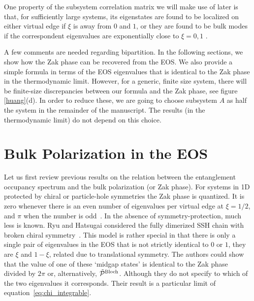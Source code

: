 \documentclass[twocolumn,amsmath,longbibliography,amssymb,superscriptaddress]{revtex4-1}
\newcommand{\mariac}[1]{{\it\color{cyan}#1}}
\begin{document}
One property of the subsystem correlation matrix we will make use of later is that, for sufficiently large systems, its eigenstates are found to be localized on either virtual edge if $\xi$ is away from $0$ and $1$, or they are found to be bulk modes if the correspondent eigenvalues are exponentially close to $\xi = 0,1$ \cite{Peschel2008}.




A few comments are needed regarding  bipartition. 
In the following sections, we show how the Zak phase can be recovered from the EOS.
We also provide a simple formula in terms of the EOS eigenvalues that is identical to the Zak phase in the thermodynamic limit.  
However, for a generic, finite size system, there will be finite-size discrepancies between our formula and the Zak phase, see figure \ref{huang}(d). 
In order to reduce these, we are going to choose subsystem $A$ as half the system in the remainder of the manuscript.
The results (in the thermodynamic limit) do not depend on this choice. 
\section{Bulk Polarization in the EOS}

Let us first review previous results on the relation between the entanglement occupancy spectrum and the bulk polarization (or Zak phase). 
For systems in 1D protected by chiral or particle-hole symmetries the Zak phase is quantized. It is zero whenever there is an even number  of eigenvalues per virtual edge at $\xi = 1/2$, and $\pi$ when the number is odd~\cite{Asboth2016}. 
In the absence of symmetry-protection, much less is known. 
Ryu and Hatsugai considered the fully dimerized SSH chain with broken chiral symmetry~\cite{Ryu2006}.  
This model is rather special in that there is only a single pair of eigenvalues in the EOS that is not strictly identical to $0$ or $1$, they are $\xi$ and $1-\xi$, related due to translational symmetry. 
The authors could show that the value of one of these `midgap states' is identical to the Zak phase divided by $2\pi$ or, alternatively, $\tilde{\mathcal{P}}^{\rm Bloch}$. Although they do not specify to which of the two eigenvalues it corresponds. 
Their result is a particular limit of equation~\eqref{eq:chi_integrable}. 
%
\end{document}
